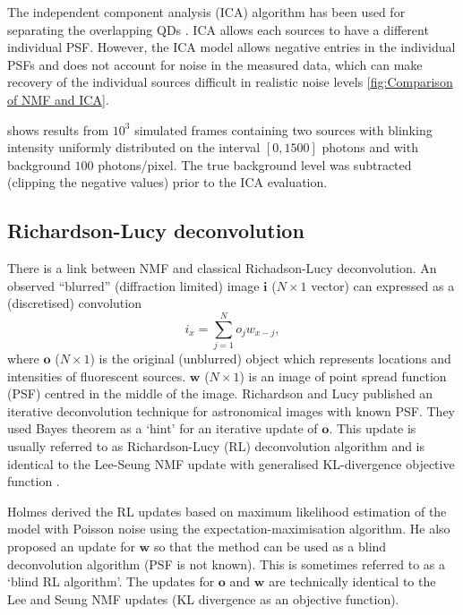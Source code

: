 The independent component analysis (ICA) algorithm \cite{Hyvarinen2000} has been used for separating the overlapping QDs \cite{Lidke2005}. ICA allows each sources to have a different individual PSF.  However, the ICA model allows negative entries in the individual PSFs and does not account for noise in the measured data, which can make recovery of the individual sources difficult in realistic noise levels \autoref{fig:Comparison of NMF and ICA}. 

 shows results from $10^{3}$ simulated frames containing two sources with blinking intensity uniformly distributed on the interval $[0, 1500]$ photons and with background $100$ photons/pixel. The true background level was subtracted (clipping the negative values) prior to the ICA evaluation.



\subsection{Richardson-Lucy deconvolution \label{sub:RL deconvolution}}
There is a link between NMF and classical Richadson-Lucy deconvolution. An observed ``blurred'' (diffraction limited) image $\bm{i}$ ($N\times1$ vector) can expressed as a (discretised) convolution 
%
\begin{equation} 
	i_{x}=\sum_{j=1}^{N}o_{j}w_{x-j}, 
\end{equation} 
%
where $\bm{o}$ ($N\times1$) is the original (unblurred) object which represents locations and intensities of fluorescent sources. $\bm{w}$ ($N\times1$) is an image of point spread function (PSF) centred in the middle of the image. Richardson \cite{Richardson1972} and Lucy \cite{Lucy1974} published an iterative deconvolution technique for astronomical images with known PSF. They used Bayes theorem as a `hint' for an iterative update of $\bm{o}$. This update is usually referred to as Richardson-Lucy (RL) deconvolution algorithm and is identical to the Lee-Seung NMF update with generalised KL-divergence objective function \cite{Lee2001}. 

Holmes \cite{Holmes:92} derived the RL updates based on maximum likelihood estimation of the model with Poisson noise using the expectation-maximisation algorithm. He also proposed an update for $\bm{w}$ so that the method can be used as a blind deconvolution algorithm (PSF is not known). This is sometimes referred to as a `blind RL algorithm'. The updates for $\bm{o}$ and $\bm{w}$ are technically identical to the Lee and Seung NMF updates (KL divergence as an objective function). 

